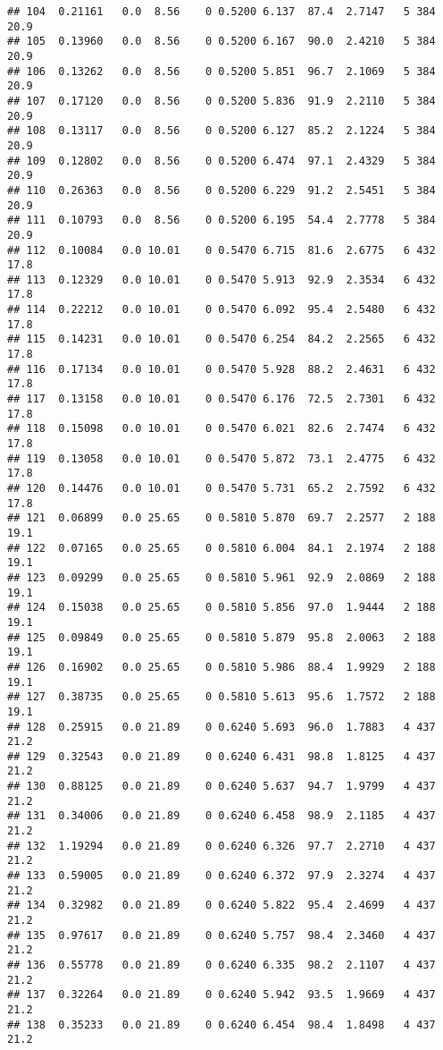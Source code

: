 \documentclass[]{article}
\begin{document}
\begin{verbatim}
## 104  0.21161   0.0  8.56    0 0.5200 6.137  87.4  2.7147   5 384    20.9
## 105  0.13960   0.0  8.56    0 0.5200 6.167  90.0  2.4210   5 384    20.9
## 106  0.13262   0.0  8.56    0 0.5200 5.851  96.7  2.1069   5 384    20.9
## 107  0.17120   0.0  8.56    0 0.5200 5.836  91.9  2.2110   5 384    20.9
## 108  0.13117   0.0  8.56    0 0.5200 6.127  85.2  2.1224   5 384    20.9
## 109  0.12802   0.0  8.56    0 0.5200 6.474  97.1  2.4329   5 384    20.9
## 110  0.26363   0.0  8.56    0 0.5200 6.229  91.2  2.5451   5 384    20.9
## 111  0.10793   0.0  8.56    0 0.5200 6.195  54.4  2.7778   5 384    20.9
## 112  0.10084   0.0 10.01    0 0.5470 6.715  81.6  2.6775   6 432    17.8
## 113  0.12329   0.0 10.01    0 0.5470 5.913  92.9  2.3534   6 432    17.8
## 114  0.22212   0.0 10.01    0 0.5470 6.092  95.4  2.5480   6 432    17.8
## 115  0.14231   0.0 10.01    0 0.5470 6.254  84.2  2.2565   6 432    17.8
## 116  0.17134   0.0 10.01    0 0.5470 5.928  88.2  2.4631   6 432    17.8
## 117  0.13158   0.0 10.01    0 0.5470 6.176  72.5  2.7301   6 432    17.8
## 118  0.15098   0.0 10.01    0 0.5470 6.021  82.6  2.7474   6 432    17.8
## 119  0.13058   0.0 10.01    0 0.5470 5.872  73.1  2.4775   6 432    17.8
## 120  0.14476   0.0 10.01    0 0.5470 5.731  65.2  2.7592   6 432    17.8
## 121  0.06899   0.0 25.65    0 0.5810 5.870  69.7  2.2577   2 188    19.1
## 122  0.07165   0.0 25.65    0 0.5810 6.004  84.1  2.1974   2 188    19.1
## 123  0.09299   0.0 25.65    0 0.5810 5.961  92.9  2.0869   2 188    19.1
## 124  0.15038   0.0 25.65    0 0.5810 5.856  97.0  1.9444   2 188    19.1
## 125  0.09849   0.0 25.65    0 0.5810 5.879  95.8  2.0063   2 188    19.1
## 126  0.16902   0.0 25.65    0 0.5810 5.986  88.4  1.9929   2 188    19.1
## 127  0.38735   0.0 25.65    0 0.5810 5.613  95.6  1.7572   2 188    19.1
## 128  0.25915   0.0 21.89    0 0.6240 5.693  96.0  1.7883   4 437    21.2
## 129  0.32543   0.0 21.89    0 0.6240 6.431  98.8  1.8125   4 437    21.2
## 130  0.88125   0.0 21.89    0 0.6240 5.637  94.7  1.9799   4 437    21.2
## 131  0.34006   0.0 21.89    0 0.6240 6.458  98.9  2.1185   4 437    21.2
## 132  1.19294   0.0 21.89    0 0.6240 6.326  97.7  2.2710   4 437    21.2
## 133  0.59005   0.0 21.89    0 0.6240 6.372  97.9  2.3274   4 437    21.2
## 134  0.32982   0.0 21.89    0 0.6240 5.822  95.4  2.4699   4 437    21.2
## 135  0.97617   0.0 21.89    0 0.6240 5.757  98.4  2.3460   4 437    21.2
## 136  0.55778   0.0 21.89    0 0.6240 6.335  98.2  2.1107   4 437    21.2
## 137  0.32264   0.0 21.89    0 0.6240 5.942  93.5  1.9669   4 437    21.2
## 138  0.35233   0.0 21.89    0 0.6240 6.454  98.4  1.8498   4 437    21.2

\end{verbatim}
\end{document}
